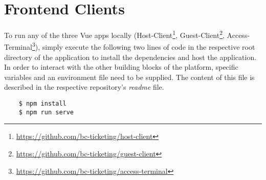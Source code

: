 \section{Frontend Clients}

To run any of the three Vue apps locally (Host-Client\footnote{\url{https://github.com/bc-ticketing/host-client}}, Guest-Client\footnote{\url{https://github.com/bc-ticketing/guest-client}}, Access-Terminal\footnote{\url{https://github.com/bc-ticketing/access-terminal}}), simply execute the following two lines of code in the respective root directory of the application to install the dependencies and host the application. In order to interact with the other building blocks of the platform, specific variables and an environment file need to be supplied. The content of this file is described in the respective repository's \textit{readme} file.

\begin{lstlisting}
    $ npm install
    $ npm run serve
\end{lstlisting}
